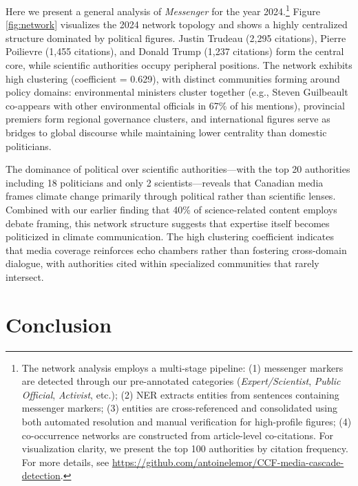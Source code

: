 \documentclass[12pt]{article}
\begin{document}
Here we present a general analysis of \emph{Messenger} for the year 2024.\footnote{The network analysis employs a multi-stage pipeline: (1) messenger markers are detected through our pre-annotated categories (\emph{Expert/Scientist}, \emph{Public Official}, \emph{Activist}, etc.); (2) NER extracts entities from sentences containing messenger markers; (3) entities are cross-referenced and consolidated using both automated resolution and manual verification for high-profile figures; (4) co-occurrence networks are constructed from article-level co-citations. For visualization clarity, we present the top 100 authorities by citation frequency. For more details, see \url{https://github.com/antoinelemor/CCF-media-cascade-detection}.} Figure \ref{fig:network} visualizes the 2024 network topology and shows a highly centralized structure dominated by political figures. Justin Trudeau (2,295 citations), Pierre Poilievre (1,455 citations), and Donald Trump (1,237 citations) form the central core, while scientific authorities occupy peripheral positions. The network exhibits high clustering (coefficient = 0.629), with distinct communities forming around policy domains: environmental ministers cluster together (e.g., Steven Guilbeault co-appears with other environmental officials in 67\% of his mentions), provincial premiers form regional governance clusters, and international figures serve as bridges to global discourse while maintaining lower centrality than domestic politicians.

The dominance of political over scientific authorities—with the top 20 authorities including 18 politicians and only 2 scientists—reveals that Canadian media frames climate change primarily through political rather than scientific lenses. Combined with our earlier finding that 40\% of science-related content employs debate framing, this network structure suggests that expertise itself becomes politicized in climate communication. The high clustering coefficient indicates that media coverage reinforces echo chambers rather than fostering cross-domain dialogue, with authorities cited within specialized communities that rarely intersect. 

\section{Conclusion}
\end{document}
